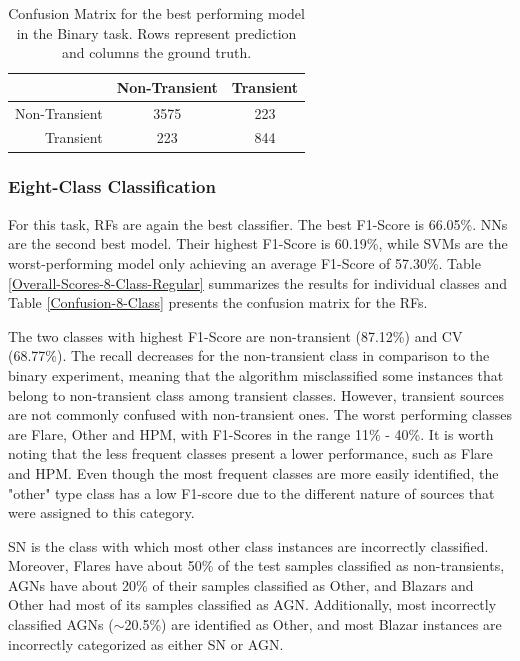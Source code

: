 \documentclass[usenatbib]{mnras}
\begin{document}
\begin{table}
\centering
\begin{tabular}{|r|c|c|}
\hline
\multicolumn{1}{|l|}{} & Non-Transient    & Transient   \\ \hline \hline
Non-Transient                & 3575       & 223    \\ \hline
Transient                    & 223       & 844   \\ \hline
\end{tabular}
\caption{Confusion Matrix for the best performing model in the Binary task. Rows represent prediction and columns the ground truth.}
\label{Confusion-Binary}
\end{table}



\subsubsection{Eight-Class Classification}

For this task, RFs are again the best classifier.  
The best F1-Score is 66.05\%. 
NNs are the second best model. 
Their highest F1-Score is 60.19\%, while SVMs are the worst-performing
model only achieving an average F1-Score of 57.30\%.
Table \ref{Overall-Scores-8-Class-Regular} summarizes the results for 
individual classes and Table \ref{Confusion-8-Class} presents 
the confusion matrix for the RFs.

The two classes with highest F1-Score are non-transient (87.12\%) and CV (68.77\%). 
The recall decreases for the non-transient class in comparison to the binary experiment, 
meaning that the algorithm misclassified some instances that belong to non-transient class
among transient classes. 
However, transient sources are not commonly confused with non-transient ones. 
The worst performing classes are Flare, Other and HPM, with F1-Scores in the 
range 11\% - 40\%. 
It is worth noting that the less frequent classes present a lower performance, 
such as Flare and HPM. 
Even though the most frequent classes are more easily identified, 
the "other" type class has a low F1-score due to the different nature 
of sources that were assigned to this category. 


SN is the class with which most other class instances are
incorrectly classified. 
Moreover, Flares have about 50\% of the test samples classified as
non-transients, AGNs have about 20\% of their 
samples classified as Other, and Blazars and Other had most of  its
samples classified as AGN. 
Additionally, most incorrectly classified AGNs ($\sim$20.5\%) are
identified as Other, and most Blazar instances are
incorrectly categorized as either SN or AGN. 
\end{document}
